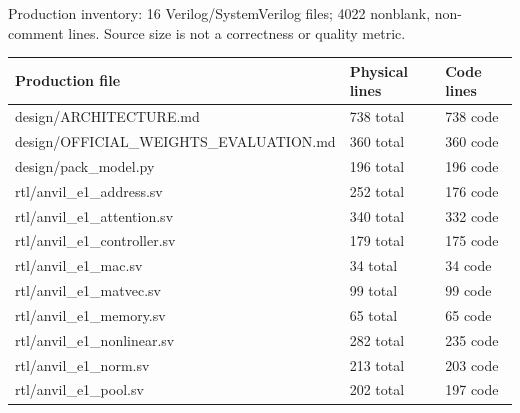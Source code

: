 \documentclass[11pt,a4paper]{article}
\begin{document}
Production inventory: 16 Verilog/\allowbreak{}SystemVerilog files; 4022 nonblank,\allowbreak{} non-comment lines. Source size is not a correctness or quality metric.

{\small\renewcommand{\arraystretch}{1.18}\begin{longtable}{@{}L{0.55\textwidth}|L{0.18\textwidth}|L{0.18\textwidth}@{}}\toprule

\textbf{Production file} & \textbf{Physical lines} & \textbf{Code lines}\\\midrule\endhead

design/\allowbreak{}ARCHITECTURE.md & 738 total & 738 code\\[2pt]\hline

design/\allowbreak{}OFFICIAL\_\allowbreak{}WEIGHTS\_\allowbreak{}EVALUATION.md & 360 total & 360 code\\[2pt]\hline

design/\allowbreak{}pack\_\allowbreak{}model.py & 196 total & 196 code\\[2pt]\hline

rtl/\allowbreak{}anvil\_\allowbreak{}e1\_\allowbreak{}address.sv & 252 total & 176 code\\[2pt]\hline

rtl/\allowbreak{}anvil\_\allowbreak{}e1\_\allowbreak{}attention.sv & 340 total & 332 code\\[2pt]\hline

rtl/\allowbreak{}anvil\_\allowbreak{}e1\_\allowbreak{}controller.sv & 179 total & 175 code\\[2pt]\hline

rtl/\allowbreak{}anvil\_\allowbreak{}e1\_\allowbreak{}mac.sv & 34 total & 34 code\\[2pt]\hline

rtl/\allowbreak{}anvil\_\allowbreak{}e1\_\allowbreak{}matvec.sv & 99 total & 99 code\\[2pt]\hline

rtl/\allowbreak{}anvil\_\allowbreak{}e1\_\allowbreak{}memory.sv & 65 total & 65 code\\[2pt]\hline

rtl/\allowbreak{}anvil\_\allowbreak{}e1\_\allowbreak{}nonlinear.sv & 282 total & 235 code\\[2pt]\hline

rtl/\allowbreak{}anvil\_\allowbreak{}e1\_\allowbreak{}norm.sv & 213 total & 203 code\\[2pt]\hline

rtl/\allowbreak{}anvil\_\allowbreak{}e1\_\allowbreak{}pool.sv & 202 total & 197 code\\[2pt]\hline


\end{longtable}}
\end{document}
